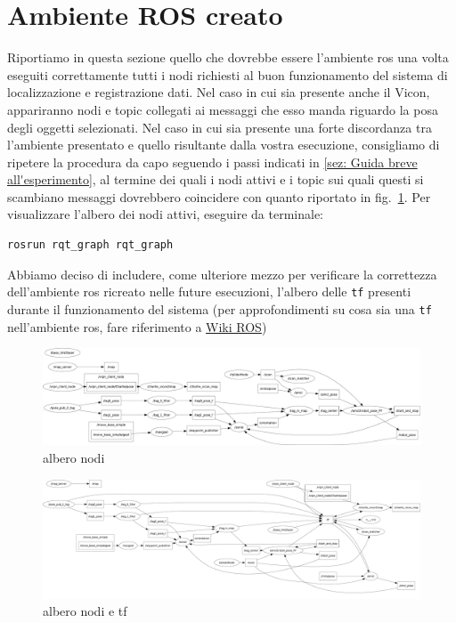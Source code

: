 \section{Ambiente ROS creato}
\label{sez:Ambiente ROS creato}
Riportiamo in questa sezione quello che dovrebbe essere l'ambiente ros una volta eseguiti correttamente tutti i nodi 
richiesti al buon funzionamento del sistema di localizzazione e registrazione dati. Nel caso in cui sia presente anche il 
Vicon, appariranno nodi e topic collegati ai messaggi che esso manda riguardo la posa degli oggetti selezionati.
Nel caso in cui sia presente una forte discordanza tra l'ambiente presentato e quello risultante dalla vostra esecuzione, consigliamo
di ripetere la procedura da capo seguendo i passi indicati in \ref{sez: Guida breve all'esperimento}, al termine dei quali i nodi attivi
e i topic sui quali questi si scambiano messaggi dovrebbero coincidere con quanto riportato in fig.~\ref{fig: albero nodi}. 
Per visualizzare l'albero dei nodi attivi, eseguire da terminale:
\begin{lstlisting}[style=bash]
	rosrun rqt_graph rqt_graph
\end{lstlisting}
Abbiamo deciso di includere, come ulteriore mezzo per verificare la correttezza dell'ambiente ros ricreato nelle future esecuzioni, l'albero delle \verb|tf| presenti durante il funzionamento del sistema (per approfondimenti su cosa sia una \verb|tf| nell'ambiente ros, fare riferimento a \href{http://wiki.ros.org/tf}{Wiki ROS})


\begin{figure} 
	\centering    
	\includegraphics[height=.4\textheight]{nodes_tree.pdf}
	\caption{albero nodi}
	\label{fig: albero nodi}
\end{figure}

\begin{figure}
	\centering    
	\includegraphics[height=.4\textheight]{nodes_withtf_tree.pdf}
	\caption{albero nodi e tf}
	\label{fig: albero nodi e tf}
\end{figure}

